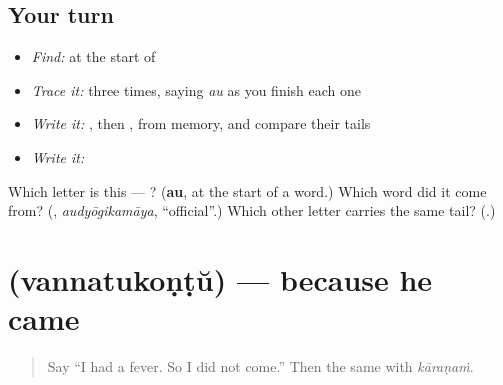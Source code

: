 \subsection*{Your turn}
\begin{itemize}
\raggedright
  \item \emph{Find:}  at the start of \textbf{}
  \item \emph{Trace it:}  three times, saying \emph{au} as you finish each one
  \item \emph{Write it:} , then , from memory, and compare their tails
  \item \emph{Write it:} \textbf{}
\end{itemize}

\begin{tcolorbox}[breakable,colback=teal!4,colframe=teal!35!black,title={Before you move on}]
Which letter is this — ? (\textbf{au}, at the start of a word.) Which word did it come from? (\textbf{}, \emph{audyōgikamāya}, \textquotedblleft{}official\textquotedblright{}.) Which other letter carries the same tail? (\textbf{}.)
\end{tcolorbox}
\section[\texorpdfstring{\ml{വന്നതുകൊണ്ട്} (vannatukoṇṭŭ)}{വന്നതുകൊണ്ട് (vannatukoṇṭŭ)}]{ (vannatukoṇṭŭ) — because he came}

\label{lesson:ML-C342-vannatukondu}



\begin{quote}
Say \textquotedblleft{}I had a fever. So I did not come.\textquotedblright{} Then the same with \emph{kāraṇaṁ}.
\end{quote}

